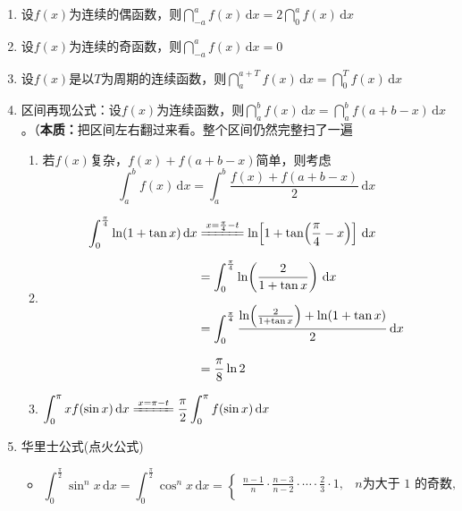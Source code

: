 \documentclass[../book.tex]{subfiles}
\begin{document}
    \begin{enumerate}
        \item 设$f(x)$为连续的偶函数，则$\dint_{-a}^{a} f(x)\,\mathrm{d}x = 2\dint_{0}^{a} f(x)\,\mathrm{d}x$
        \item 设$f(x)$为连续的奇函数，则$\dint_{-a}^{a} f(x)\,\mathrm{d}x = 0$
        \item 设$f(x)$是以$T$为周期的连续函数，则$\dint_{a}^{a + T} f(x)\,\mathrm{d}x = \dint_{0}^{T} f(x)\,\mathrm{d}x$
        \item 区间再现公式：设$f(x)$为连续函数，则$\dint_{a}^{b} f(x)\,\mathrm{d}x = \dint_{a}^{b} f(a + b - x)\,\mathrm{d}x$。（\textbf{本质：}把区间左右翻过来看。整个区间仍然完整扫了一遍
        \begin{enumerate}
            \item 若$f(x)$复杂，$f(x) + f(a + b - x)$简单，则考虑
            \[
                \int_a^b f(x)\,\mathrm{d}x = \int_a^b \frac{f(x) + f(a + b - x)}{2}\,\mathrm{d}x
            \]
            \item {}
            \[
                \begin{aligned}
                    \int_0^{\frac{\pi}{4}} \ln(1+\tan x)\,\mathrm{d}x
                    &\xlongequal{x=\frac{\pi}{4}-t}
                    \ln\!\left[1+\tan\!\left(\frac{\pi}{4}-x\right)\right]
                    \,\mathrm{d}x \\[6pt]
                    &= \int_0^{\frac{\pi}{4}}
                    \ln\!\left(\frac{2}{1+\tan x}\right)
                    \,\mathrm{d}x \\[6pt]
                    &= \int_0^{\frac{\pi}{4}}
                    \frac{
                        \ln\!\left(\frac{2}{1+\tan x}\right)
                        +
                        \ln(1+\tan x)
                    }{2}
                    \,\mathrm{d}x \\[8pt]
                    &= \frac{\pi}{8}\ln 2
                \end{aligned}
            \]
            \item $\dint_0^{\pi} xf(\sin x)\,\mathrm{d}x \xlongequal{x=\pi-t} \dfrac{\pi}{2}\dint_0^{\pi} f(\sin x)\,\mathrm{d}x$
        \end{enumerate}
        \item 华里士公式(点火公式)
        \begin{itemize}
            \item \[
                      \int_{0}^{\frac{\pi}{2}} \sin^{n} x \,\mathrm{d}x
                      =
                      \int_{0}^{\frac{\pi}{2}} \cos^{n} x \,\mathrm{d}x
                      =
                      \begin{cases}
                          \displaystyle
                          \frac{n-1}{n}
                          \cdot
                          \frac{n-3}{n-2}
                          \cdot
                          \cdots
                          \cdot
                          \frac{2}{3}
                          \cdot
                          1,
                          & n \text{为大于 1 的奇数}, \\[1.2em]


\end{cases}\]
\end{itemize}
\end{enumerate}
\end{document}
